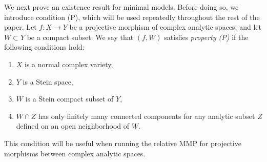 \documentclass[11pt]{amsart}
\numberwithin{equation}{section}
\def\bbeta{\boldsymbol{\beta}}
\def\OO{\mathcal O}
\newcommand\R{{\mathbb{R}}}
\theoremstyle{definition}
\theoremstyle{definition}
\newtheorem{lemma}[theorem]{Lemma}
\theoremstyle{definition}
\begin{document}



We next prove an existence result for minimal models. Before doing so, we introduce condition {(P)}, which will be used repeatedly throughout the rest of the paper. Let $f: X \to Y$ be a projective morphism of complex analytic spaces, and let $W \subset Y$ be a compact subset. We say that $(f,W)$ satisfies \textit{property (P)} if the following conditions hold:
\begin{enumerate}
\item $X$ is a normal complex variety,
\item $Y$ is a Stein space,
\item $W$ is a Stein compact subset of $Y$,
\item $W \cap Z$ has only finitely many connected components for any analytic subset $Z$ defined on an open neighborhood of $W$.
\end{enumerate}
This condition will be useful when running the relative MMP for projective morphisms between complex analytic spaces.
\end{document}
